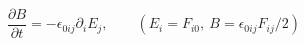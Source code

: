 \begin{equation}\label{max}
\frac{\partial{B}}{\partial{t}} = -\epsilon_{0ij}\partial_{i}E_{j},
\qquad (E_{i} = F_{i0},~B= \epsilon_{0ij}F_{ij}/2)
\end{equation}

